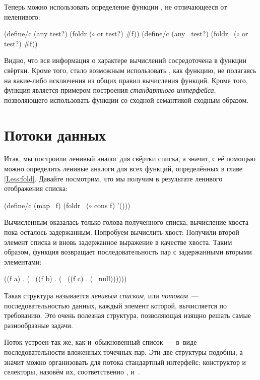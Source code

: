 Теперь можно использовать определение функции , не отличающееся от неленивого:
\begin{SchemeCode}[emph={el,res,test?,lst}]
(define/c (any test?)  (foldr  ($\circ$ or test?) #f))
(define/c (any~ test?) (foldr~ ($\circ$ or test?) #f))
\end{SchemeCode}
Видно, что вся информация о характере вычислений сосредоточена в функции свёртки. Кроме того, стало возможным использовать , как функцию, не полагаясь на какие-либо исключения из общих правил вычисления функций.
Кроме того, функция  является примером построения \emph{стандартного интерфейса}, позволяющего использовать функции со сходной семантикой сходным образом.

\section[2]{Потоки данных}%
%
%
Итак, мы построили ленивый аналог для свёртки списка, а значит, с её помощью можно определить ленивые аналоги для всех функций, определённых в главе \ref{Less:fold}. Давайте посмотрим, что мы получим в результате ленивого отображения списка:
\begin{Definition}[emph={f}]
(define/c (map~ f) (foldr~ ($\circ$ cons f) '())) 
\end{Definition}
Вычисленным оказалась только голова полученного списка, вычисление хвоста пока осталось задержанным. Попробуем вычислить хвост:
Получили второй элемент списка и вновь задержанное выражение в качестве хвоста. Таким образом, функция  возвращает последовательность пар с задержанными вторыми элементами:
\begin{SchemeCode}
((f a) . (~ ((f b) . (~ ((f c) . (~ null))))))
\end{SchemeCode}
Такая структура называется \emph{ленивым списком}, или \emph{потоком}~--- последовательностью данных, каждый элемент которой, вычисляется по требованию. Это очень полезная структура, позволяющая изящно решать самые разнообразные задачи.

Поток устроен так же, как и~обыкновенный список~--- в~виде последовательности вложенных точечных пар. Эти две структуры подобны, а значит можно организовать для потока стандартный интерфейс: конструктор и селекторы, назовём их, соответственно ,  и~.

